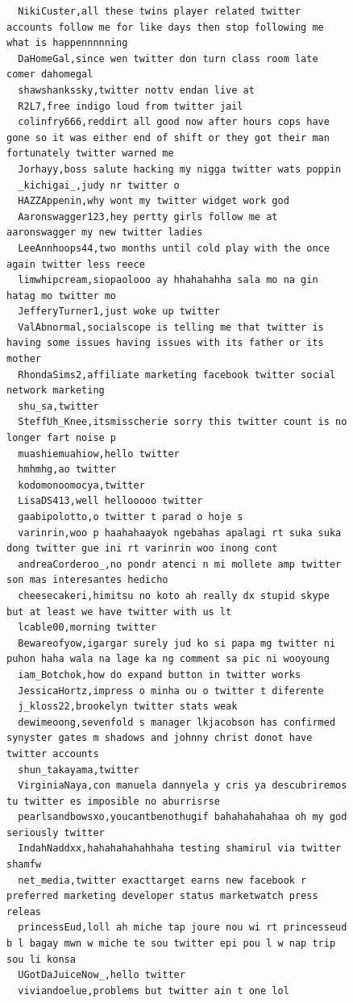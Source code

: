 \begin{figure}[htpb]
\begin{verbatim}
  NikiCuster,all these twins player related twitter accounts follow me for like days then stop following me what is happennnnning
  DaHomeGal,since wen twitter don turn class room late comer dahomegal
  shawshankssky,twitter nottv endan live at
  R2L7,free indigo loud from twitter jail
  colinfry666,reddirt all good now after hours cops have gone so it was either end of shift or they got their man fortunately twitter warned me
  Jorhayy,boss salute hacking my nigga twitter wats poppin
  _kichigai_,judy nr twitter o
  HAZZAppenin,why wont my twitter widget work god
  Aaronswagger123,hey pertty girls follow me at aaronswagger my new twitter ladies
  LeeAnnhoops44,two months until cold play with the once again twitter less reece
  limwhipcream,siopaolooo ay hhahahahha sala mo na gin hatag mo twitter mo
  JefferyTurner1,just woke up twitter
  ValAbnormal,socialscope is telling me that twitter is having some issues having issues with its father or its mother
  RhondaSims2,affiliate marketing facebook twitter social network marketing
  shu_sa,twitter
  SteffUh_Knee,itsmisscherie sorry this twitter count is no longer fart noise p
  muashiemuahiow,hello twitter
  hmhmhg,ao twitter
  kodomonoomocya,twitter
  LisaDS413,well hellooooo twitter
  gaabipolotto,o twitter t parad o hoje s
  varinrin,woo p haahahaayok ngebahas apalagi rt suka suka dong twitter gue ini rt varinrin woo inong cont
  andreaCorderoo_,no pondr atenci n mi mollete amp twitter son mas interesantes hedicho
  cheesecakeri,himitsu no koto ah really dx stupid skype but at least we have twitter with us lt
  lcable00,morning twitter
  Bewareofyow,igargar surely jud ko si papa mg twitter ni puhon haha wala na lage ka ng comment sa pic ni wooyoung
  iam_Botchok,how do expand button in twitter works
  JessicaHortz,impress o minha ou o twitter t diferente
  j_kloss22,brookelyn twitter stats weak
  dewimeoong,sevenfold s manager lkjacobson has confirmed synyster gates m shadows and johnny christ donot have twitter accounts
  shun_takayama,twitter
  VirginiaNaya,con manuela dannyela y cris ya descubriremos tu twitter es imposible no aburrisrse
  pearlsandbowsxo,youcantbenothugif bahahahahahaa oh my god seriously twitter
  IndahNaddxx,hahahahahahhaha testing shamirul via twitter shamfw
  net_media,twitter exacttarget earns new facebook r preferred marketing developer status marketwatch press releas
  princessEud,loll ah miche tap joure nou wi rt princesseud b l bagay mwn w miche te sou twitter epi pou l w nap trip sou li konsa
  UGotDaJuiceNow_,hello twitter
  viviandoelue,problems but twitter ain t one lol

\end{verbatim}
\end{figure}
